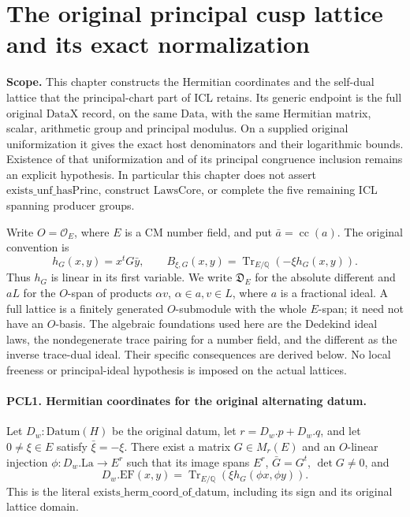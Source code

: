 \section{The original principal cusp lattice and its exact normalization}
\label{sec:principal-cusp-lattices-v047}

\noindent\textbf{Scope.}
This chapter constructs the Hermitian coordinates and the self-dual
lattice that the principal-chart part of ICL retains.  Its generic
endpoint is the full original \(\mathrm{DataX}\) record, on the same
\(\mathrm{Data}\), with the same Hermitian matrix, scalar, arithmetic
group and principal modulus.  On a supplied original uniformization
it gives the exact host denominators and their logarithmic bounds.
Existence of that uniformization and of its principal congruence
inclusion remains an explicit hypothesis.  In particular this chapter
does not assert \(\mathrm{exists\_unf\_hasPrinc}\), construct
\(\mathrm{LawsCore}\), or complete the five remaining ICL spanning
producer groups.

Write \(O=\mathcal O_E\), where \(E\) is a CM number field, and put
\(\bar a=\operatorname{cc}(a)\).  The original convention is
\[
 h_G(x,y)=x^tG\bar y,\qquad
 B_{\xi,G}(x,y)=\operatorname{Tr}_{E/\mathbb Q}
                                      (-\xi h_G(x,y)).       \tag{PCL.1}
\]
Thus \(h_G\) is linear in its first variable.  We write
\(\mathfrak D_E\) for the absolute different and \(aL\) for the
\(O\)-span of products \(\alpha v\), \(\alpha\in a,v\in L\),
where \(a\) is a fractional ideal.  A full lattice is a finitely
generated \(O\)-submodule with the whole \(E\)-span; it need not
have an \(O\)-basis.  The algebraic foundations used here are the
Dedekind ideal laws, the nondegenerate trace pairing for a number
field, and the different as the inverse trace-dual ideal.  Their
specific consequences are derived below.  No local freeness or
principal-ideal hypothesis is imposed on the actual lattices.

\paragraph{PCL1. Hermitian coordinates for the original alternating datum.}
\label{claim:PCL1}
Let \(D_w:\mathrm{Datum}(H)\) be the original datum, let
\(r=D_w.p+D_w.q\), and let \(0\ne\xi\in E\) satisfy
\(\bar\xi=-\xi\).  There exist a matrix \(G\in M_r(E)\)
and an \(O\)-linear injection \(\phi:D_w.\mathrm{La}\to E^r\)
such that its image spans \(E^r\), \(\bar G=G^t\),
\(\det G\ne0\), and
\[
 D_w.\mathrm{EF}(x,y)
       =\operatorname{Tr}_{E/\mathbb Q}
                            (\xi h_G(\phi x,\phi y)).       \tag{PCL.2}
\]
This is the literal \(\mathrm{exists\_herm\_coord\_of\_datum}\),
including its sign and its original lattice domain.

